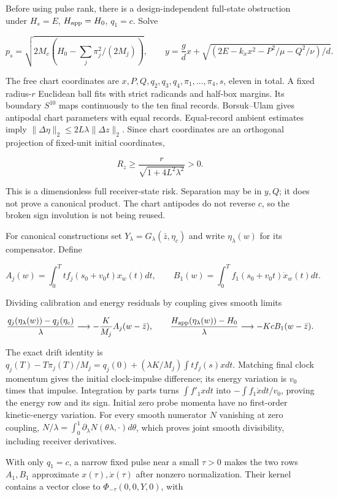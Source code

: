 \documentclass[11pt,a4paper]{article}
\begin{document}
Before using pulse rank, there is a design-independent full-state
obstruction under \(H_s=E\), \(H_{\rm app}=H_0\), \(q_1=c\). Solve

\[p_s=\sqrt{2M_c(H_0-\sum_j\pi_j^2/(2M_j))},\qquad
 y=\frac gd x+\sqrt{(2E-k_xx^2-P^2/\mu-Q^2/\nu)/d}.\]

The free chart coordinates are
\(x,P,Q,q_2,q_3,q_4,\pi_1,\ldots,\pi_4,s\), eleven in total. A fixed
radius-\(r\) Euclidean ball fits with strict radicands and half-box
margins. Its boundary \(S^{10}\) maps continuously to the ten final
records. Borsuk--Ulam gives antipodal chart parameters with equal
records. Equal-record ambient estimates imply
\(\|\Delta\eta\|_2\le2L\lambda\|\Delta z\|_2\). Since chart coordinates
are an orthogonal projection of fixed-unit initial coordinates,

\[R_z\ge\frac{r}{\sqrt{1+4L^2\lambda^2}}>0.\]

This is a dimensionless full receiver-state risk. Separation may be in
\(y,Q\); it does not prove a canonical product. The chart antipodes do
not reverse \(c\), so the broken sign involution is not being reused.

For canonical constructions set \(Y_\lambda=G_\lambda(\bar z,\eta_c)\)
and write \(\eta_\lambda(w)\) for its compensator. Define

\[A_j(w)=\int_0^Tt f_j(s_0+v_0t)x_w(t)dt,\qquad
B_1(w)=\int_0^Tf_1(s_0+v_0t)\dot x_w(t)dt.\]

Dividing calibration and energy residuals by coupling gives smooth
limits

\[\frac{q_j(\eta_\lambda(w))-q_j(\eta_c)}\lambda
 \longrightarrow-\frac K{M_j}A_j(w-\bar z),\qquad
\frac{H_{\rm app}(\eta_\lambda(w))-H_0}\lambda
 \longrightarrow-KcB_1(w-\bar z).\]

The exact drift identity is
\(q_j(T)-T\pi_j(T)/M_j=q_j(0)+(\lambda K/M_j)\int t f_j(s)xdt\).
Matching final clock momentum gives the initial clock-impulse
difference; its energy variation is \(v_0\) times that impulse.
Integration by parts turns \(\int f'_1xdt\) into
\(-\int f_1\dot xdt/v_0\), proving the energy row and its sign. Initial
zero probe momenta have no first-order kinetic-energy variation. For
every smooth numerator \(N\) vanishing at zero coupling,
\(N/\lambda=\int_0^1\partial_\lambda N(\theta\lambda,\cdot)d\theta\),
which proves joint smooth divisibility, including receiver derivatives.

With only \(q_1=c\), a narrow fixed pulse near a small \(\tau>0\) makes
the two rows \(A_1,B_1\) approximate \(x(\tau),\dot x(\tau)\) after
nonzero normalization. Their kernel contains a vector close to
\(\Phi_{-\tau}(0,0,Y,0)\), with
\end{document}
